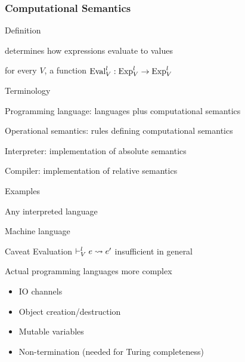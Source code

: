 \begin{frame}\frametitle{Computational Semantics}
\begin{blockitems}{Definition}
\item determines how expressions evaluate to values
\item for every $V$, a function $\mathrm{Eval}^l_V:\mathrm{Exp}^l_V\to\mathrm{Exp}^l_V$
\end{blockitems}

\begin{blockitems}{Terminology}
\item Programming language: languages plus computational semantics
\item Operational semantics: rules defining computational semantics
\item Interpreter: implementation of absolute semantics
\item Compiler: implementation of relative semantics
\end{blockitems}

\begin{blockitems}{Examples}
\item Any interpreted language 
\item Machine language 
\end{blockitems}
\end{frame}

\begin{frame}{Caveat}
Evaluation $\vdash^l_V e\rightsquigarrow e'$ insufficient in general

Actual programming languages more complex
\begin{itemize}
\item IO channels
\item Object creation/destruction
\item Mutable variables
\item Non-termination (needed for Turing completeness)
\end{itemize}
\end{frame}

